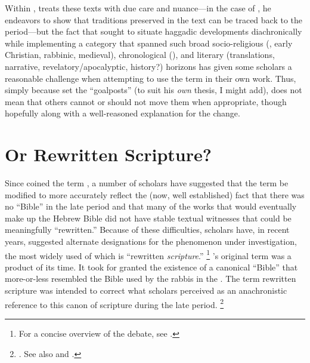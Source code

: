 Within , \vermes treats these texts with due care and nuance---in the case of \sefer, he endeavors to show that traditions preserved in the text can be traced back to the \secondtemple period---but the fact that \vermes sought to situate haggadic developments diachronically while implementing a category that spanned such broad socio-religious (\qumran, early Christian, rabbinic, medieval), chronological (), and literary (translations, narrative, revelatory/apocalyptic, history?) horizons has given some scholars a reasonable challenge when attempting to use the term in their own work. Thus, simply because \vermes set the ``goalposts'' (to suit his \emph{own} thesis, I might add), does not mean that others cannot or should not move them when appropriate, though hopefully along with a well-reasoned explanation for the change. 

\section{\rwb Or Rewritten Scripture?}

Since \vermes coined the term \rwb, a number of scholars have suggested that the term be modified to more accurately reflect the (now, well established) fact that there was no ``Bible'' in the late \secondtemple period and that many of the works that would eventually make up the Hebrew Bible did not have stable textual witnesses that could be meaningfully ``rewritten.'' Because of these difficulties, scholars have, in recent years, suggested alternate designations for the phenomenon under investigation, the most widely used of which is ``rewritten \emph{scripture}.''%
    \footnote{%
        For a concise overview of the debate, see
        \cite{zahn_weissenberg-pakkala2011}.}
\vermes's original term \rwb was a product of its time. It took for granted the existence of a canonical ``Bible'' that more-or-less resembled the Bible used by the rabbis in the . The term rewritten scripture was intended to correct what scholars perceived as an anachronistic reference to this canon of scripture during the late \secondtemple period.%
    \footnote{%
        \Cite[58--59]{campbell_zsengeller2014}. See also
        \cite{ulrich_mcdonald-sanders2002} and 
        \cite{ulrich_zsengeller2014}.}

